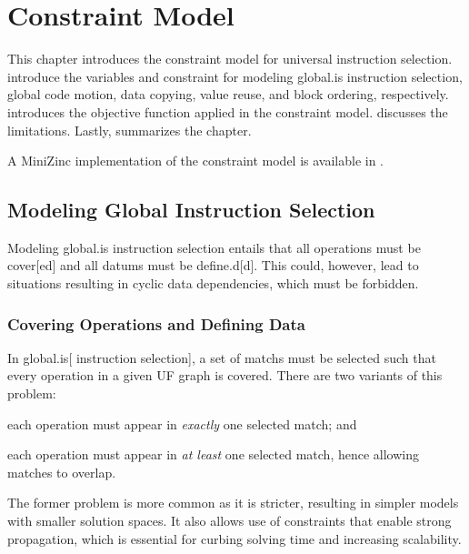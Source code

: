 %

\chapter{Constraint Model}

This chapter introduces the \gls{constraint model} for \gls{universal
  instruction selection}.
%
introduce the \glspl{variable} and \gls{constraint} for modeling \gls{global.is}
\gls{instruction selection}, \gls{global code motion}, \gls{data copying},
\gls{value reuse}, and \gls{block ordering}, respectively.
%
 introduces the \gls{objective function}
applied in the \gls{constraint model}.
%
 discusses the 
limitations.
%
Lastly,  summarizes the chapter.

A \gls{MiniZinc} implementation of the \gls{constraint model} is available in
.


\section{Modeling Global Instruction Selection}

Modeling \gls{global.is} \gls{instruction selection} entails that all
\glspl{operation} must be \gls{cover}[ed] and all \glspl{datum} must be
\gls{define.d}[d].
%
This could, however, lead to situations resulting in cyclic data dependencies,
which must be forbidden.


\subsection{Covering Operations and Defining Data}

In \gls{global.is}[ \gls{instruction selection}], a set of \glspl{match} must be
selected such that every \gls{operation} in a given \gls{UF graph} is covered.
%
There are two variants of this problem:
%
\begin{enumerate*}[label=(\arabic*)]
  \item each \gls{operation} must appear in \emph{exactly} one selected
    \gls{match}; and
%
  \item each \gls{operation} must appear in \emph{at least} one selected
    \gls{match}, hence allowing matches to \gls{overlap}.
\end{enumerate*}
%
The former problem is more common as it is stricter, resulting in simpler models
with smaller \glspl{solution space}.
%
It also allows use of \glspl{constraint} that enable strong \gls{propagation},
which is essential for curbing solving time and increasing scalability.

